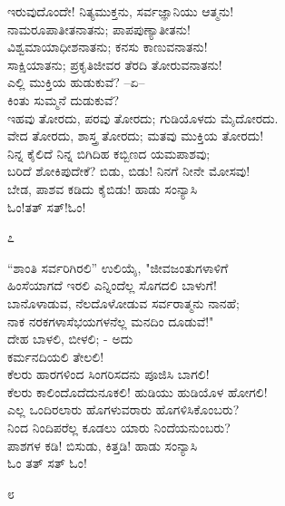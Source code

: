 \begin{myquote}
ಇರುವುದೊಂದೇ! ನಿತ್ಯಮುಕ್ತನು, ಸರ್ವಜ್ಞಾನಿಯು ಆತ್ಮನು!\\ನಾಮರೂಪಾತೀತನಾತನು; ಪಾಪಪುಣ್ಯಾತೀತನು!\\ವಿಶ್ವಮಾಯಾಧೀಶನಾತನು; ಕನಸು ಕಾಣುವನಾತನು!\\ಸಾಕ್ಷಿಯಾತನು; ಪ್ರಕೃತಿಜೀವರ ತೆರದಿ ತೋರುವನಾತನು!\\ಎಲ್ಲಿ ಮುಕ್ತಿಯ ಹುಡುಕುವೆ? –ಏ–\\ಕಿಂತು ಸುಮ್ಮನೆ ದುಡುಕುವೆ?\\ಇಹವು ತೋರದು, ಪರವು ತೋರದು; ಗುಡಿಯೊಳದು ಮೈದೋರದು.\\ವೇದ ತೋರದು, ಶಾಸ್ತ್ರ ತೋರದು; ಮತವು ಮುಕ್ತಿಯ ತೋರದು!\\ನಿನ್ನ ಕೈಲಿದೆ ನಿನ್ನ ಬಿಗಿದಿಹ ಕಬ್ಬಿಣದ ಯಮಪಾಶವು;\\ಬರಿದೆ ಶೋಕಿಪುದೇಕೆ? ಬಿಡು, ಬಿಡು! ನಿನಗೆ ನೀನೇ ಮೋಸವು!\\ಬೇಡ, ಪಾಶವ ಕಡಿದು ಕೈಬಿಡು! ಹಾಡು ಸಂನ್ಯಾಸಿ\\ಓಂ!ತತ್ ಸತ್!ಓಂ!
\end{myquote}

\begin{center}
೭
\end{center}

\begin{myquote}
“ಶಾಂತಿ ಸರ್ವರಿಗಿರಲಿ” ಉಲಿಯೈ, "ಜೀವಜಂತುಗಳಾಳಿಗೆ\\ಹಿಂಸೆಯಾಗದೆ ಇರಲಿ ಎನ್ನಿಂದೆಲ್ಲ ಸೊಗದಲಿ ಬಾಳುಗೆ!\\ಬಾನೊಳಾಡುವ, ನೆಲದೊಳೋಡುವ ಸರ್ವರಾತ್ಮನು ನಾನಹೆ;\\ನಾಕ ನರಕಗಳಾಸೆಭಯಗಳನೆಲ್ಲ ಮನದಿಂ ದೂಡುವೆ!"\\ದೇಹ ಬಾಳಲಿ, ಬೀಳಲಿ; - ಅದು\\ಕರ್ಮನದಿಯಲಿ ತೇಲಲಿ!\\ಕೆಲರು ಹಾರಗಳಿಂದ ಸಿಂಗರಿಸದನು ಪೂಜಿಸಿ ಬಾಗಲಿ!\\ಕೆಲರು ಕಾಲಿಂದೊದೆದುನೂಕಲಿ! ಹುಡಿಯು ಹುಡಿಯೊಳ ಹೋಗಲಿ!\\ಎಲ್ಲ ಒಂದಿರಲಾರು ಹೊಗಳುವರಾರು ಹೊಗಳಿಸಿಕೊಂಬರು?\\ನಿಂದ ನಿಂದಿಪರೆಲ್ಲ ಕೂಡಲು ಯಾರು ನಿಂದೆಯನುಂಬರು?\\ಪಾಶಗಳ ಕಡಿ! ಬಿಸುಡು, ಕಿತ್ತಡಿ! ಹಾಡು ಸಂನ್ಯಾಸಿ\\ಓಂ ತತ್ ಸತ್ ಓಂ!
\end{myquote}

\begin{center}
೮
\end{center}

